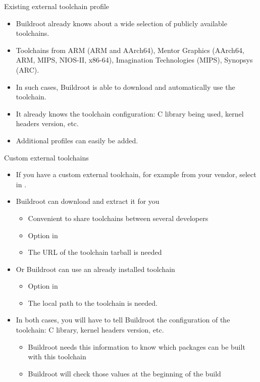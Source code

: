 \begin{frame}{Existing external toolchain profile}
  \begin{itemize}
  \item Buildroot already knows about a wide selection of publicly
    available toolchains.
  \item Toolchains from ARM (ARM and AArch64), Mentor Graphics
    (AArch64, ARM, MIPS, NIOS-II, x86-64), Imagination Technologies
    (MIPS), Synopsys (ARC).
  \item In such cases, Buildroot is able to download and automatically
    use the toolchain.
  \item It already knows the toolchain configuration: C library being
    used, kernel headers version, etc.
  \item Additional profiles can easily be added.
  \end{itemize}
\end{frame}

\begin{frame}{Custom external toolchains}
  \begin{itemize}
  \item If you have a custom external toolchain, for example from your
    vendor, select  in .
  \item Buildroot can download and extract it for you
    \begin{itemize}
    \item Convenient to share toolchains between several
      developers
    \item Option  in 
    \item The URL of the toolchain tarball is needed
    \end{itemize}
  \item Or Buildroot can use an already installed toolchain
    \begin{itemize}
    \item Option  in 
    \item The local path to the toolchain is needed.
    \end{itemize}
  \item In both cases, you will have to tell Buildroot the
    configuration of the toolchain: C library, kernel headers version,
    etc.
    \begin{itemize}
    \item Buildroot needs this information to know which packages can
      be built with this toolchain
    \item Buildroot will check those values at the beginning of the
      build
    \end{itemize}
  \end{itemize}
\end{frame}

